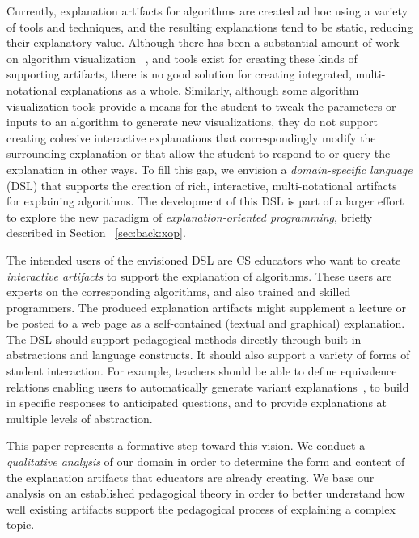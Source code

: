 \documentclass[sigconf]{acmart}
\begin{document}
Currently, explanation artifacts for algorithms are created ad hoc using a
variety of tools and techniques, and the resulting explanations tend to be
static, reducing their explanatory value.
%
Although there has been a substantial amount of work on algorithm visualization~
\cite{Gloor92,Gloor97,HDS02, shaffer2010algorithm, HANSEN2002291, KANN1997223},
and tools exist for creating these kinds of supporting artifacts, there is no
good solution for creating integrated, multi-notational explanations as a whole.
Similarly, although some algorithm visualization tools provide a means for the
student to tweak the parameters or inputs to an algorithm to generate new
visualizations, they do not support creating cohesive interactive explanations
that correspondingly modify the surrounding explanation or that allow the
student to respond to or query the explanation in other ways.
%
To fill this gap, we envision a \emph{domain-specific language} (DSL) that
supports the creation of rich, interactive, multi-notational artifacts for
explaining algorithms.
%
The development of this DSL is part of a larger effort to explore the new
paradigm of \emph{explanation-oriented programming}, briefly described in
Section~ \ref{sec:back:xop}.


The intended users of the envisioned DSL are CS educators who want to create
\emph{interactive artifacts} to support the explanation of algorithms. These
users are experts on the corresponding algorithms, and also trained and skilled
programmers. The produced explanation artifacts might supplement a lecture or
be posted to a web page as a self-contained (textual and graphical)
explanation.
%
The DSL should support pedagogical methods directly through built-in
abstractions and language constructs. It should also support a variety of forms
of student interaction. For example, teachers should be able to define
equivalence relations enabling users to automatically generate variant
explanations~\cite{EW13jvlc}, to build in specific responses to anticipated
questions, and to provide explanations at multiple levels of abstraction.


This paper represents a formative step toward this vision. We conduct a
\emph{qualitative analysis} of our domain in order to determine the form and
content of the explanation artifacts that educators are already creating.
%
We base our analysis on an established pedagogical theory in order to better
understand how well existing artifacts support the pedagogical process of
explaining a complex topic.
\end{document}
